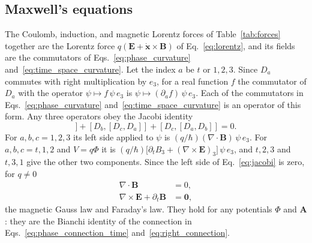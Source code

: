 \documentclass[aps,prd,onecolumn,tightenlines,nofootinbib,notitlepage,11pt,floatfix]{revtex4-2}
\theoremstyle{indentedtheorem}
\begin{document}
\subsection{Maxwell's equations}
\label{sec:maxwell}

The Coulomb, induction, and magnetic Lorentz forces of Table~\ref{tab:forces} together are the Lorentz force $q(\mathbf{E}+\dot{\mathbf{x}}\times\mathbf{B})$ of Eq.~\eqref{eq:lorentz}, and its fields are the commutators of Eqs.~\eqref{eq:phase_curvature} and~\eqref{eq:time_space_curvature}. Let the index $a$ be $t$ or $1,2,3$. Since $D_a$ commutes with right multiplication by $e_3$, for a real function $f$ the commutator of $D_a$ with the operator $\psi\mapsto f\,\psi\,e_3$ is $\psi\mapsto(\partial_af)\,\psi\,e_3$. Each of the commutators in Eqs.~\eqref{eq:phase_curvature} and~\eqref{eq:time_space_curvature} is an operator of this form. Any three operators obey the Jacobi identity
\begin{equation}
    [D_a,[D_b,D_c]] + [D_b,[D_c,D_a]] + [D_c,[D_a,D_b]] = 0 .
    \label{eq:jacobi}
\end{equation}
For $a,b,c=1,2,3$ its left side applied to $\psi$ is $(q/\hbar)(\nabla\cdot\mathbf{B})\,\psi\,e_3$. For $a,b,c=t,1,2$ and $V=q\Phi$ it is $(q/\hbar)\big[\partial_tB_3+(\nabla\times\mathbf{E})_3\big]\,\psi\,e_3$, and $t,2,3$ and $t,3,1$ give the other two components. Since the left side of Eq.~\eqref{eq:jacobi} is zero, for $q\neq0$
\begin{align}
    \nabla\cdot\mathbf{B} &= 0 ,
    \label{eq:no_monopole} \\
    \nabla\times\mathbf{E}+\partial_t\mathbf{B} &= \mathbf{0} ,
    \label{eq:faraday}
\end{align}
the magnetic Gauss law and Faraday's law. They hold for any potentials $\Phi$ and $\mathbf{A}$: they are the Bianchi identity of the connection in Eqs.~\eqref{eq:phase_connection_time} and~\eqref{eq:right_connection}.
\end{document}
